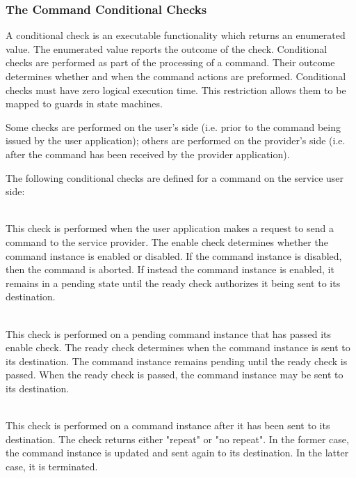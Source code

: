 \subsubsection{The Command Conditional Checks}\label{sec:CmdCondChecks}

A conditional check is an executable functionality which returns an enumerated value. The enumerated value reports the outcome of the check. Conditional checks are performed as part of the processing of a command. Their outcome determines whether and when the command actions are preformed. Conditional checks must have zero logical execution time. This restriction allows them to be mapped to guards in state machines. 

Some checks are performed on the user's side (i.e. prior to the command being issued by the user application); others are performed on the provider's side (i.e. after the command has been received by the provider application). 

The following conditional checks are defined for a command on the service user side:

\begin{fw_description}
\item[Enable Check]\hfill\\
This check is performed when the user application makes a request to send a command to the service provider. The enable check determines whether the command instance is enabled or disabled. If the command instance is disabled, then the command is aborted. If instead the command instance is enabled, it remains in a pending state until the ready check authorizes it being sent to its destination.

\item[Ready Check]\hfill\\
This check is performed on a pending command instance that has passed its enable check. The ready check determines when the command instance is sent to its destination.  The command instance remains pending until the ready check is passed. When the ready check is passed, the command instance may be sent to its destination. 

\item[Repeat Check]\hfill\\
This check is performed on a command instance after it has been sent to its destination. The check returns either "repeat" or "no repeat". In the former case, the command instance is updated and sent again to its destination. In the latter case, it is terminated.
\end{fw_description}

